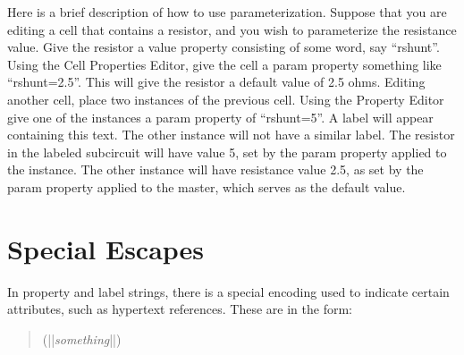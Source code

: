 Here is a brief description of how to use parameterization.  Suppose
that you are editing a cell that contains a resistor, and you wish to
parameterize the resistance value.  Give the resistor a {\et value}
property consisting of some word, say ``{\vt rshunt}''.  Using the
{\cb Cell Properties Editor}, give the cell a {\et param} property
something like ``{\vt rshunt=2.5}''.  This will give the resistor a
default value of 2.5 ohms.  Editing another cell, place two instances
of the previous cell.  Using the {\cb Property Editor} give one of the
instances a {\et param} property of ``{\vt rshunt=5}''.  A label will
appear containing this text.  The other instance will not have a
similar label.  The resistor in the labeled subcircuit will have value
5, set by the {\et param} property applied to the instance.  The
other instance will have resistance value 2.5, as set by the {\et
param} property applied to the master, which serves as the default
value.


\section{Special Escapes}
\label{prpescapes}

In property and label strings, there is a special encoding used to
indicate certain attributes, such as hypertext references.  These are
in the form:
\begin{quote}
{\vt (||}{\it something\/}{\vt ||)}
\end{quote}

